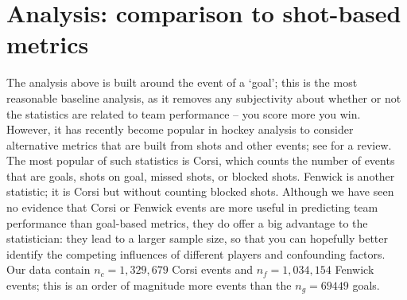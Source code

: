 \section{Analysis: comparison to shot-based metrics}
\label{sec:shots}


The analysis above is built around the event of a `goal'; this is the most
reasonable baseline analysis, as it removes any subjectivity about whether or
not the statistics are related to team performance -- you score more you win.
However, it has recently become popular in hockey analysis to consider
alternative metrics that are built from shots and other events; see
\cite{vol10} for a review. The most popular of such statistics is Corsi, which
counts the number of events that are goals, shots on goal, missed shots, or
blocked shots.  Fenwick is another statistic; it is Corsi but without counting
blocked shots.  Although we have seen no evidence that Corsi or Fenwick events
are more useful in predicting team performance than goal-based metrics, they
do offer a big advantage to the statistician: they lead to a larger sample
size, so that you can hopefully better identify the competing influences of
different players and confounding factors. Our data contain
$n_{c}=1,329,679$ Corsi events and $n_{f}=1,034,154$ Fenwick events; this is
an order of magnitude more events than the $n_g=69449$ goals.


